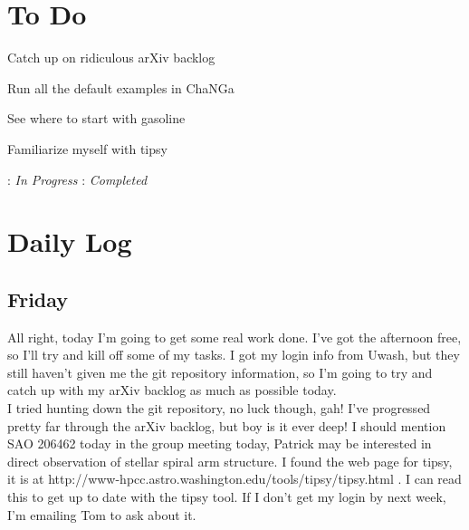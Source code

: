 \documentclass[11pt,letterpaper]{article}
\begin{document}
\section{To Do}
\begin{bullets}
\item[\checkmark] Catch up on ridiculous arXiv backlog
\item[\checkmark] Run all the default examples in ChaNGa
\item See where to start with gasoline
\item Familiarize myself with tipsy
\end{bullets}

\textleaf : \textit{In Progress} \qquad \checkmark : \textit{Completed}
\section{Daily Log}

\subsection{Friday}

All right, today I'm going to get some real work done. I've got the
afternoon free, so I'll try and kill off some of my tasks. I got my
login info from Uwash, but they still haven't given me the git
repository information, so I'm going to try and catch up with my arXiv
backlog as much as possible today.\\I tried hunting down the git
repository, no luck though, gah! I've progressed pretty far through the
arXiv backlog, but boy is it ever deep! I should mention SAO 206462
today in the group meeting today, Patrick may be interested in direct
observation of stellar spiral arm structure. I found the web page for
tipsy, it is at
http://www-hpcc.astro.washington.edu/tools/tipsy/tipsy.html . I can read
this to get up to date with the tipsy tool. If I don't get my login by
next week, I'm emailing Tom to ask about it.
\end{document}
